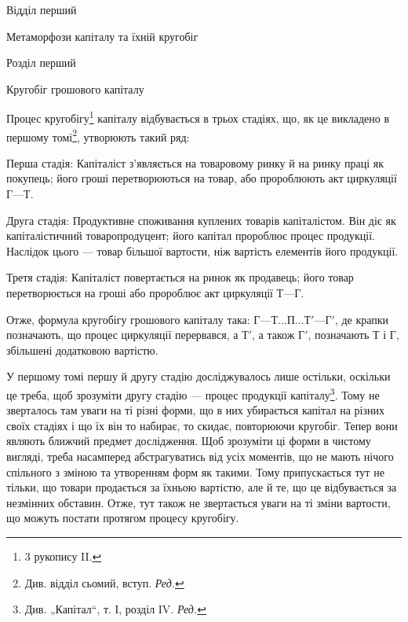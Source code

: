 \parcont{}  %
Відділ перший

Метаморфози капіталу та їхній кругобіг

Розділ перший

Кругобіг грошового капіталу

Процес кругобігу\footnote{
3 рукопису II.
} капіталу відбувається в трьох стадіях, що, як
це викладено в першому томі\footnote*{
Див. відділ сьомий, вступ. \emph{Ред.}
}, утворюють такий ряд:

Перша стадія: Капіталіст з’являється на товаровому ринку й на
ринку праці як покупець; його гроші перетворюються на товар, або пророблюють
акт циркуляції $Г — Т$.

Друга стадія: Продуктивне споживання куплених товарів капіталістом.
Він діє як капіталістичний товаропродуцент; його капітал пророблює
процес продукції. Наслідок цього — товар більшої вартости, ніж
вартість елементів його продукції.

Третя стадія: Капіталіст повертається на ринок як продавець; його
товар перетворюється на гроші або пророблює акт циркуляції $Т — Г$.

Отже, формула кругобігу грошового капіталу така: $Г — Т\dots{} П\dots{} Т' —
Г'$, де крапки позначають, що процес циркуляції перервався, а $Т'$, а
також $Г'$, позначають Т і Г, збільшені додатковою вартістю.

У першому томі першу й другу стадію досліджувалось лише остільки,
оскільки це треба, щоб зрозуміти другу стадію — процес продукції капіталу\footnote*{
Див. „Капітал“, т. І, розділ IV. \emph{Ред.}
}.
Тому не зверталось там уваги на ті різні форми, що в них убирається
капітал на різних своїх стадіях і що їх він то набирає, то скидає,
повторюючи кругобіг. Тепер вони являють ближчий предмет дослідження.
Щоб зрозуміти ці форми в чистому вигляді, треба насамперед абстрагуватись
від усіх моментів, що не мають нічого спільного з зміною та
утворенням форм як такими. Тому припускається тут не тільки, що товари
продається за їхньою вартістю, але й те, що це відбувається за
незмінних обставин. Отже, тут також не звертається уваги на ті зміни
вартости, що можуть постати протягом процесу кругобігу.
